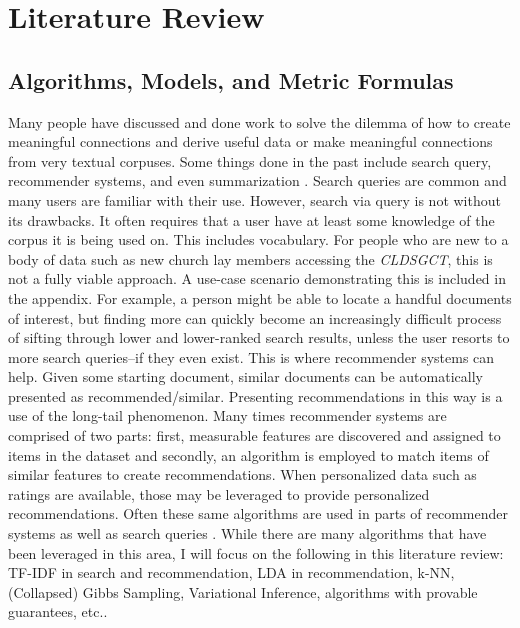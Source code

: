 \chapter{Literature Review}

\section{Algorithms, Models, and Metric Formulas}

Many people have discussed and done work to solve the dilemma of how to create meaningful connections and derive useful data or make meaningful connections from very textual corpuses. Some things done in the past include search query, recommender systems, and even summarization \citep{Mani01summarizationevaluation:2001}. Search queries are common and many users are familiar with their use. However, search via query is not without its drawbacks. It often requires that a user have at least some knowledge of the corpus it is being used on. This includes vocabulary. For people who are new to a body of data such as new church lay members accessing the \textit{CLDSGCT}, this is not a fully viable approach. A use-case scenario demonstrating this is included in the appendix. For example, a person might be able to locate a handful documents of interest, but finding more can quickly become an increasingly difficult process of sifting through lower and lower-ranked search results, unless the user resorts to more search queries--if they even exist. This is where recommender systems can help. Given some starting document, similar documents can be automatically presented as recommended/similar. Presenting recommendations in this way is a use of the long-tail phenomenon. Many times recommender systems are comprised of two parts: first, measurable features are discovered and assigned to items in the dataset and secondly, an algorithm is employed to match items of similar features to create recommendations. When personalized data such as ratings are available, those may be leveraged to provide personalized recommendations. Often these same algorithms are used in parts of recommender systems as well as search queries \citep{}. While there are many algorithms that have been leveraged in this area, I will focus on the following in this literature review: TF-IDF in search and recommendation, LDA in recommendation, k-NN, (Collapsed) Gibbs Sampling, Variational Inference, algorithms with provable guarantees, etc..

